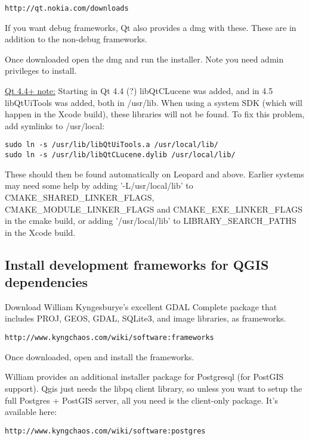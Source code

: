 \begin{verbatim}
http://qt.nokia.com/downloads
\end{verbatim}

If you want debug frameworks, Qt also provides a dmg with these.  These are in
addition to the non-debug frameworks.

Once downloaded open the dmg and run the installer. Note you need admin
privileges to install.

\underline{Qt 4.4+ note:} Starting in Qt 4.4 (?) libQtCLucene was added, and in 4.5 libQtUiTools was added, both in /usr/lib.  When using a system SDK (which will happen in the Xcode build), these libraries will not be found.  To fix this problem, add symlinks to /usr/local:

\begin{verbatim}
sudo ln -s /usr/lib/libQtUiTools.a /usr/local/lib/
sudo ln -s /usr/lib/libQtCLucene.dylib /usr/local/lib/
\end{verbatim}

These should then be found automatically on Leopard and above.  Earlier systems
may need some help by adding '-L/usr/local/lib' to CMAKE\_SHARED\_LINKER\_FLAGS,
CMAKE\_MODULE\_LINKER\_FLAGS and CMAKE\_EXE\_LINKER\_FLAGS in the cmake build, or
adding '/usr/local/lib' to LIBRARY\_SEARCH\_PATHS in the Xcode build.

\subsection{Install development frameworks for QGIS dependencies}
Download William Kyngesburye's excellent GDAL Complete package that includes PROJ, GEOS, GDAL, SQLite3, and image libraries, as frameworks.

\begin{verbatim}
http://www.kyngchaos.com/wiki/software:frameworks
\end{verbatim}

Once downloaded, open and install the frameworks.

William provides an additional installer package for Postgresql (for PostGIS support).
Qgis just needs the libpq client library, so unless you want to setup the full
Postgres + PostGIS server, all you need is the client-only package.
It's available here:

\begin{verbatim}
http://www.kyngchaos.com/wiki/software:postgres 
\end{verbatim}

